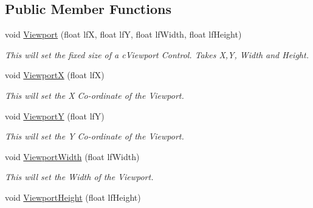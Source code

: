\subsection*{Public Member Functions}
\begin{DoxyCompactItemize}
\item 
\hypertarget{classc_viewport_control_aa6a247ab5ceba96ba5fb7e62f437bcab}{
void \hyperlink{classc_viewport_control_aa6a247ab5ceba96ba5fb7e62f437bcab}{Viewport} (float lfX, float lfY, float lfWidth, float lfHeight)}
\label{classc_viewport_control_aa6a247ab5ceba96ba5fb7e62f437bcab}

\begin{DoxyCompactList}\small\item\em This will set the fixed size of a cViewport Control. Takes X,Y, Width and Height. \end{DoxyCompactList}\item 
\hypertarget{classc_viewport_control_abf9547c7d226676f365be5ca7e8902c6}{
void \hyperlink{classc_viewport_control_abf9547c7d226676f365be5ca7e8902c6}{ViewportX} (float lfX)}
\label{classc_viewport_control_abf9547c7d226676f365be5ca7e8902c6}

\begin{DoxyCompactList}\small\item\em This will set the X Co-\/ordinate of the Viewport. \end{DoxyCompactList}\item 
\hypertarget{classc_viewport_control_a1d04f9918c03552877be7d7c2ece62b8}{
void \hyperlink{classc_viewport_control_a1d04f9918c03552877be7d7c2ece62b8}{ViewportY} (float lfY)}
\label{classc_viewport_control_a1d04f9918c03552877be7d7c2ece62b8}

\begin{DoxyCompactList}\small\item\em This will set the Y Co-\/ordinate of the Viewport. \end{DoxyCompactList}\item 
\hypertarget{classc_viewport_control_a26c50c8441fcd1d1bc2c4649df7cf17b}{
void \hyperlink{classc_viewport_control_a26c50c8441fcd1d1bc2c4649df7cf17b}{ViewportWidth} (float lfWidth)}
\label{classc_viewport_control_a26c50c8441fcd1d1bc2c4649df7cf17b}

\begin{DoxyCompactList}\small\item\em This will set the Width of the Viewport. \end{DoxyCompactList}\item 
\hypertarget{classc_viewport_control_a7b5e508f96f8225a1a37e12b50b9c0d7}{
void \hyperlink{classc_viewport_control_a7b5e508f96f8225a1a37e12b50b9c0d7}{ViewportHeight} (float lfHeight)}
\label{classc_viewport_control_a7b5e508f96f8225a1a37e12b50b9c0d7}


\end{DoxyCompactItemize}

